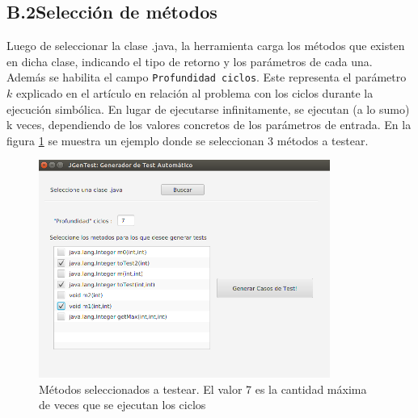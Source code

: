 \documentclass{llncs}
\begin{document}
    \subsection*{B.2\enspace Selección de métodos}
    Luego de seleccionar la clase .java, la herramienta carga los métodos que existen en dicha clase, indicando el tipo de retorno y los parámetros de cada una.
    Además se habilita el campo \texttt{Profundidad ciclos}. Este representa el parámetro $k$ explicado en el artículo en relación al problema con los ciclos durante
    la ejecución simbólica. En lugar de ejecutarse infinitamente, se ejecutan (a lo sumo) k veces, dependiendo de los valores concretos de los parámetros de entrada.
    En la figura \ref{fig:seleccionaParams} se muestra un ejemplo donde se seleccionan 3 métodos a testear.
    \begin{figure}
    \centering
    \includegraphics[width=0.85\textwidth]{screenshots/2-seleccionMetodos}
    \caption{Métodos seleccionados a testear. El valor 7 es la cantidad máxima de veces que se ejecutan los ciclos }
    \label{fig:seleccionaParams}
    \end{figure}
    
\end{document}
